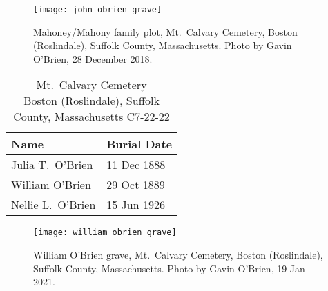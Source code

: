 \begin{figure}
	\centering
	\texttt{[image: john\_obrien\_grave]}
	\caption{Mahoney/Mahony family plot, Mt.\ Calvary Cemetery, Boston (Roslindale), Suffolk County, Massachusetts. Photo by Gavin O'Brien, 28 December 2018.}
\end{figure}

\begin{table}[ht]
	\centering
	\caption{Mt.\ Calvary Cemetery\cite{William3OBrienBurial} \\
		Boston (Roslindale), Suffolk County, Massachusetts
		C7-22-22}
	\begin{tabular}{|l|l|}
		\hline
		\textbf{Name} & \textbf{Burial Date} \\
		\hline
		Julia T.\ O'Brien\index{McCarty!Julia T.}\index{O'Brien!Julia T.\ (McCarty)} & 11 Dec 1888 \\
		\hline
		William O'Brien\index{O'Brien!William\textsuperscript{3}} & 29 Oct 1889 \\
		\hline
		Nellie L.\ O'Brien\index{O'Brien!Ellen/Nellie Louise\textsuperscript{4}} & 15 Jun 1926 \\
		\hline
	\end{tabular}
\end{table}

\begin{figure}
	\centering
	\texttt{[image: william\_obrien\_grave]}
	\caption{William O'Brien grave, Mt.\ Calvary Cemetery, Boston (Roslindale), Suffolk County, Massachusetts. Photo by Gavin O'Brien, 19 Jan 2021.}
\end{figure}
